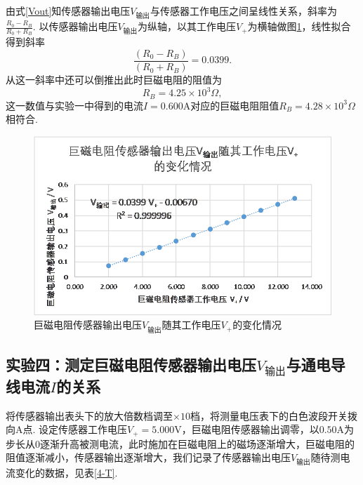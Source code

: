 \documentclass[UTF8,10pt,a4paper]{article}
\begin{document}
由式\eqref{Vout}知传感器输出电压$V_{\text{输出}}$与传感器工作电压之间呈线性关系，斜率为$\frac{R_0-R_B}{R_0+R_B}$. 以传感器输出电压$V_{\text{输出}}$为纵轴，以其工作电压$V_+$为横轴做图\ref{3-F}，线性拟合得到斜率
\[
    \frac{(R_0-R_B)}{(R_0+R_B)}=0.0399.
\]
从这一斜率中还可以倒推出此时巨磁电阻的阻值为
\[
    R_B=4.25\times 10^3\Omega,
\]
这一数值与实验一中得到的电流$I=0.600$A对应的巨磁电阻阻值$R_B=4.28\times 10^3\Omega$相符合.

\begin{figure}[h]
    \centering
    \includegraphics[width=.5\textwidth]{3-F.png}
    \caption{巨磁电阻传感器输出电压$V_{\text{输出}}$随其工作电压$V_+$的变化情况}
    \label{3-F}
\end{figure}

\clearpage

\subsection{实验四：测定巨磁电阻传感器输出电压$V_{\text{输出}}$与通电导线电流$I$的关系}

将传感器输出表头下的放大倍数档调至$\times 10$档，将测量电压表下的白色波段开关拨向A点. 设定传感器工作电压$V_+=5.000$V，巨磁电阻传感器输出调零，以$0.50$A为步长从$0$逐渐升高被测电流，此时施加在巨磁电阻上的磁场逐渐增大，巨磁电阻的阻值逐渐减小，传感器输出逐渐增大，我们记录了传感器输出电压$V_{\text{输出}}$随待测电流变化的数据，见表\ref{4-T}.
\end{document}
